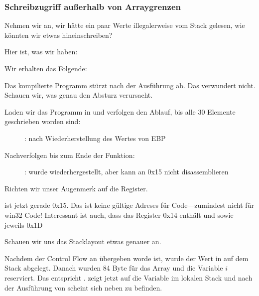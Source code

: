 \subsubsection{Schreibzugriff außerhalb von Arraygrenzen}
Nehmen wir an, wir hätte ein paar Werte illegalerweise vom Stack gelesen, wie könnten wir etwas hineinschreiben?

Hier ist, was wir haben:




Wir erhalten das Folgende:


Das kompilierte Programm stürzt nach der Ausführung ab. Das verwundert nicht. Schauen wir, was genau den Absturz
verursacht.

\clearpage
\myindex{\olly}
Laden wir das Programm in \olly und verfolgen den Ablauf, bis alle 30 Elemente geschrieben worden sind:

\begin{figure}[H]
\centering
{}
\caption{\olly: nach Wiederherstellung des Wertes von EBP}
\label{fig:array_BO_olly_w1}
\end{figure}

\clearpage
Nachverfolgen bis zum Ende der Funktion:

\begin{figure}[H]
\centering
{}
\caption{\olly: 
 wurde wiederhergestellt, aber \olly kann an 0x15 nicht disassemblieren}
\label{fig:array_BO_olly_w2}
\end{figure}
Richten wir unser Augenmerk auf die Register.

\EPI ist jetzt gerade 0x15. Das ist keine gültige Adreses für Code---zumindest nicht für win32 Code!
Interessant ist auch, dass das \EBP Register 0x14 enthält und \ECX sowie \EDX jeweils 0x1D

Schauen wir uns das Stacklayout etwas genauer an.

Nachdem der Control Flow an \TT{\main} übergeben worde ist, wurde der Wert in \EBP auf dem Stack abgelegt.
Danach wurden 84 Byte für das Array und die Variable $i$ reserviert.
Das entspricht .
\ESP zeigt jetzt auf die Variable  im lokalen Stack und nach der Ausführung von  scheint sich
 neben  zu befinden.

